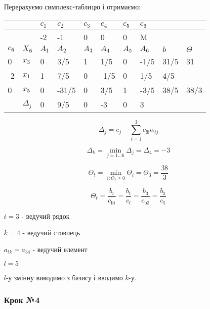 \documentclass[a4paper, 12pt]{article}
\begin{document}
Перерахуємо симплекс-таблицю і отримаємо:

\begin{table}[H]
    \centering
    \begin{tabular}{|l|l|l|l|l|l|l|l|l|l|}
    \hline
         &  & $c_1$ & $c_2$ & $c_3$ & $c_4$ & $c_5$ & $c_6$ & & \\ \hline
         &  & -2 & -1 & 0 & 0 & 0 & M &  &  \\ \hline
         $c_\text{б}$ & $X_\text{б}$ & $A_1$ & $A_2$ & $A_3$ & $A_4$ & $A_5$ & $A_6$ & $b$  & $\Theta$ \\ \hline
        0 & $x_3$ & 0 & 3/5 & 1 & 1/5 & 0 & -1/5 & 31/5 & 31 \\ \hline
        -2 & $x_1$ & 1 & 7/5 & 0 & -1/5 & 0 & 1/5 & 4/5 & \\ \hline
        0 & $x_5$ & 0 & -31/5 & 0 & 3/5 & 1 & -3/5 & 38/5 & 38/3 \\ \hline
         & $\Delta_j$ & 0 & 9/5 & 0 & -3 & 0 & 3 &  &  \\ \hline
    \end{tabular}
\end{table}

\begin{equation*}
	\Delta_j = c_j - \sum_{i=1}^{3} c_\text{бi} \alpha_{ij}  
\end{equation*}

\begin{equation*}
	\Delta_k = \min_{j=1 \dots 6} \Delta_j = \Delta_4 = -3
\end{equation*}

\begin{equation*}
	\Theta_t = \min_{i: \Theta_i \geqslant 0} \Theta_i = \Theta_3 = \frac{38}{3}
\end{equation*}

\begin{equation*}
	\Theta_t = \frac{b_t}{c_\text{bt}} = \frac{b_t}{c_l} = \frac{b_3}{c_\text{b3}} = \frac{b_3}{c_\text{5}}
\end{equation*}

$t = 3$ - ведучий рядок

$k = 4$ - ведучий стовпець

$a_{tk} = a_{34}$ - ведучий елемент

$l = 5$

$l$-у змінну виводимо з базису і вводимо $k$-у.

\subsubsection{Крок №4}
\end{document}
